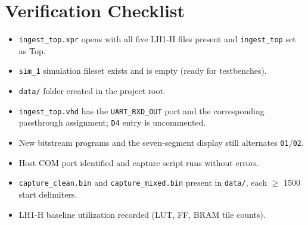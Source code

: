 \documentclass[11pt,letterpaper]{article}
\begin{document}

\section{Verification Checklist}
\begin{itemize}[leftmargin=2em]
	\item[$\square$] \texttt{ingest\_top.xpr} opens with all five LH1-H files present and \texttt{ingest\_top} set as Top.
	\item[$\square$] \texttt{sim\_1} simulation fileset exists and is empty (ready for testbenches).
	\item[$\square$] \texttt{data/} folder created in the project root.
	\item[$\square$] \texttt{ingest\_top.vhd} has the \texttt{UART\_RXD\_OUT} port and the corresponding pass\-through assignment; \XDC{} \texttt{D4} entry is uncommented.
	\item[$\square$] New bitstream programs and the seven-segment display still alternates \texttt{01}/\texttt{02}.
	\item[$\square$] Host \mbox{COM} port identified and capture script runs without errors.
	\item[$\square$] \texttt{capture\_clean.bin} and \texttt{capture\_mixed.bin} present in \texttt{data/}, each $\geq$ 1500 start delimiters.
	\item[$\square$] LH1-H baseline utilization recorded (LUT, FF, BRAM tile counts).
\end{itemize}
\end{document}
